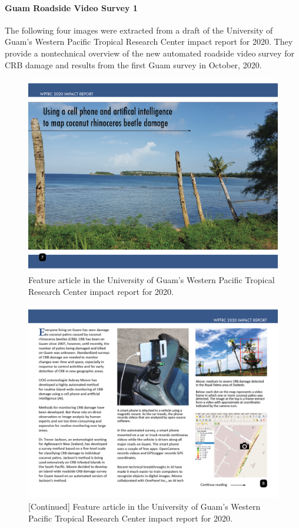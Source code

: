 \documentclass[12pt,letterpaper,english,bibliography=totocnumbered,abstract=on]{scrartcl}
\begin{document}
\paragraph{Guam Roadside Video Survey 1}

The following four images were extracted from a draft of the University of Guam's Western Pacific Tropical Research Center impact report for 2020. They provide a nontechnical overview of the new automated roadside video survey for CRB damage and results from the first Guam survey in October, 2020.

\begin{figure}[h]
	\centering
	\includegraphics[width=1\linewidth]{images/impact-report07.png}
	\caption{Feature article in the University of Guam's Western Pacific Tropical Research Center impact report for 2020.}
	\label{fig:roadside1-1}
\end{figure}

\begin{figure}[h]
	\centering
	\includegraphics[width=1\linewidth]{images/impact-report08.png}
	\caption{[Continued] Feature article in the University of Guam's Western Pacific Tropical Research Center impact report for 2020.}
	\label{fig:roadside1-2}
\end{figure}
\end{document}
